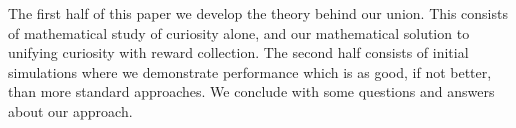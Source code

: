 The first half of this paper we develop the theory behind our union. This consists of mathematical study of curiosity alone, and our mathematical solution to unifying curiosity with reward collection. The second half consists of initial simulations where we demonstrate performance which is as good, if not better, than more standard approaches. We conclude with some questions and answers about our approach.
